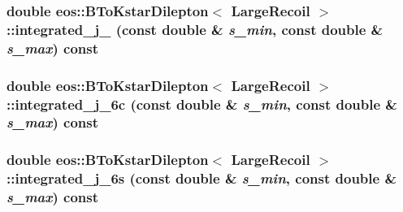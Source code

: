 \label{classeos_1_1BToKstarDilepton_3_01LargeRecoil_01_4_ad1b9d4ed45d58d3ba4ee5b53d4e4657f}
\hypertarget{classeos_1_1BToKstarDilepton_3_01LargeRecoil_01_4_a713b072eac8610b7aadfdd1250608f91}{
\subsubsection[{integrated\_\-j\_\-5}]{\setlength{\rightskip}{0pt plus 5cm}double eos::BToKstarDilepton$<$ {\bf LargeRecoil} $>$::integrated\_\-j\_ (const double \& {\em s\_\-min}, \/  const double \& {\em s\_\-max}) const}}
\label{classeos_1_1BToKstarDilepton_3_01LargeRecoil_01_4_a713b072eac8610b7aadfdd1250608f91}
\hypertarget{classeos_1_1BToKstarDilepton_3_01LargeRecoil_01_4_affaef081192cd5f06c8aabd2a6ccc404}{
\subsubsection[{integrated\_\-j\_\-6c}]{\setlength{\rightskip}{0pt plus 5cm}double eos::BToKstarDilepton$<$ {\bf LargeRecoil} $>$::integrated\_\-j\_\-6c (const double \& {\em s\_\-min}, \/  const double \& {\em s\_\-max}) const}}
\label{classeos_1_1BToKstarDilepton_3_01LargeRecoil_01_4_affaef081192cd5f06c8aabd2a6ccc404}
\hypertarget{classeos_1_1BToKstarDilepton_3_01LargeRecoil_01_4_ab93356611a370d9035a54a4a93797dac}{
\subsubsection[{integrated\_\-j\_\-6s}]{\setlength{\rightskip}{0pt plus 5cm}double eos::BToKstarDilepton$<$ {\bf LargeRecoil} $>$::integrated\_\-j\_\-6s (const double \& {\em s\_\-min}, \/  const double \& {\em s\_\-max}) const}}
\label{classeos_1_1BToKstarDilepton_3_01LargeRecoil_01_4_ab93356611a370d9035a54a4a93797dac}
